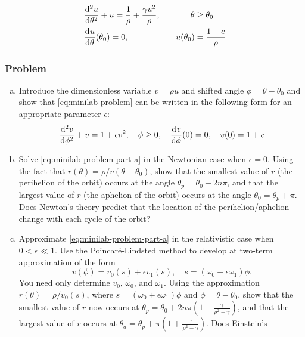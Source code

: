 \documentclass[12pt,twoside]{article}
\begin{document}
\begin{equation}
  \label{eq:minilab-problem}
  \begin{aligned}
    &\od[2]{u}{\theta} + u = \frac{1}{\rho} + \frac{\gamma u^2}{\rho},&\quad
    \theta&\ge\theta_0 \\
    &\od{u}{\theta}(\theta_0) = 0, &\quad u(\theta_0)&=\frac{1+c}{\rho} \\
  \end{aligned}
\end{equation}

\subsubsection*{Problem}
\begin{enumerate}[(a)]
\item Introduce the dimensionless variable $v=\rho u$ and shifted angle
  $\phi=\theta-\theta_0$ and show that \cref{eq:minilab-problem} can be written
  in the following form for an appropriate parameter $\epsilon$:
  \begin{equation}
    \label{eq:minilab-problem-part-a}
    \od[2]{v}{\phi} + v = 1 + \epsilon v^2,\quad \phi\ge0,\quad
    \od{v}{\phi}(0)=0,\quad v(0)=1+c
  \end{equation}
\item\label{itm:minilab-b} Solve \cref{eq:minilab-problem-part-a} in the
  Newtonian case when $\epsilon=0$. Using the fact that
  $r(\theta)=\rho/v(\theta-\theta_0)$, show that the smallest value of $r$ (the
  perihelion of the orbit) occurs at the angle $\theta_p=\theta_0+2n\pi$, and
  that the largest value of $r$ (the aphelion of the orbit) occurs at the angle
  $\theta_0=\theta_p+\pi$. Does Newton's theory predict that the location of the
  perihelion/aphelion change with each cycle of the orbit?
\item\label{itm:minilab-c} Approximate \cref{eq:minilab-problem-part-a} in the
  relativistic case when $0<\epsilon\ll1$. Use the Poincar\'{e}-Lindsted method
  to develop at two-term approximation of the form
  $$v(\phi)=v_0(s)+\epsilon v_1(s),\quad s=(\omega_0+\epsilon\omega_1)\phi.$$
  You need only determine $v_0$, $\omega_0$, and $\omega_1$. Using the
  approximation $r(\theta)=\rho/v_0(s)$, where
  $s=(\omega_0+\epsilon\omega_1)\phi$ and $\phi=\theta-\theta_0$, show that the
  smallest value of $r$ now occurs at
  $\theta_p=\theta_0+2n\pi(1+\frac{\gamma}{\rho^2-\gamma})$, and that the
  largest value of $r$ occurs at
  $\theta_a=\theta_p+\pi(1+\frac{\gamma}{\rho^2-\gamma})$. Does Einstein's

\end{enumerate}
\end{document}
